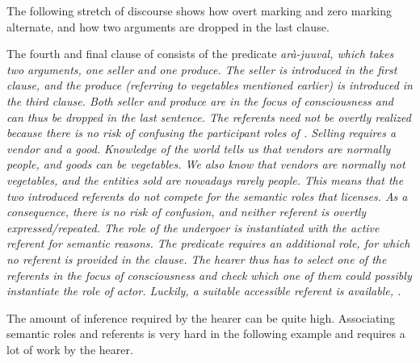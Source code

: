 The following stretch of discourse shows how overt marking and zero marking alternate, and how two arguments are dropped in the last clause.


The fourth and final clause of  consists of the predicate \em arà-juuval\em, which takes two arguments, one seller and one produce. The seller  is introduced in the first clause, and the produce  (referring to vegetables mentioned earlier) is introduced in the third clause. Both seller and produce are in the focus of consciousness and can thus be dropped in the last sentence. The referents  need not be overtly realized because there is no risk of confusing  the participant roles of .  Selling requires a vendor and a good. Knowledge of the world tells us that vendors are normally people, and goods can be vegetables. We also know that vendors are normally not vegetables, and the entities sold are nowadays rarely people. This means that the two introduced referents do not compete for the semantic roles that  licenses. As a consequence, there is no risk of confusion, and neither referent is overtly expressed/repeated. The role of the undergoer is instantiated with the active referent  for semantic reasons. The predicate requires an additional role, for which no referent is provided in the clause. The hearer thus has to select one of the  referents in the focus of consciousness and check which one of them could possibly instantiate the role of actor. Luckily, a suitable accessible referent is available, .

The amount of inference required by the hearer can be quite high. Associating semantic roles and referents is very hard in the following example and requires a lot of work by the hearer.


